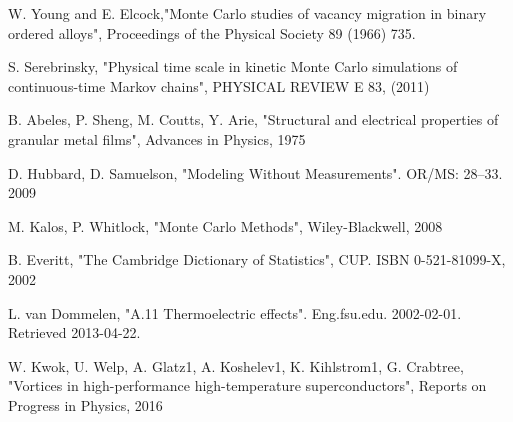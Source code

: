 \begin{thebibliography}{10}
 W. Young and E. Elcock,"Monte Carlo studies of vacancy migration in binary ordered alloys", Proceedings of the Physical Society 89 (1966) 735.

 S. Serebrinsky, "Physical time scale in kinetic Monte Carlo simulations of continuous-time Markov chains", PHYSICAL REVIEW E 83, (2011)

 B. Abeles, P. Sheng, M. Coutts, Y. Arie, "Structural and electrical properties of granular metal films", Advances in Physics, 1975

 D. Hubbard, D. Samuelson, "Modeling Without Measurements". OR/MS: 28–33. 2009

 M. Kalos, P. Whitlock, "Monte Carlo Methods", Wiley-Blackwell, 2008

 B. Everitt, "The Cambridge Dictionary of Statistics", CUP. ISBN 0-521-81099-X, 2002

 L. van Dommelen, "A.11 Thermoelectric effects". Eng.fsu.edu. 2002-02-01. Retrieved 2013-04-22.

 W. Kwok, U. Welp, A. Glatz1, A. Koshelev1, K. Kihlstrom1, G. Crabtree, "Vortices in high-performance high-temperature superconductors", Reports on Progress in Physics, 2016

\end{thebibliography}
